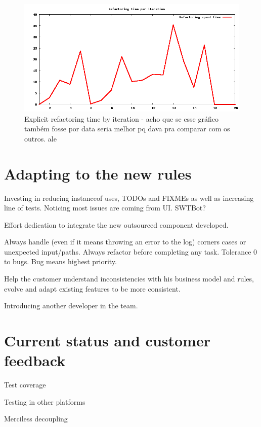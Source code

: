 \documentclass[lnbip]{svmultln}
\begin{document}
\begin{figure}[hbt]
  \centerline{
    \includegraphics[width=120mm]{refactoring.png}
  }
  \caption{Explicit refactoring time by iteration - acho que se esse gráfico também fosse por data seria melhor pq dava pra comparar com os outros. ale}%
  \label{fig:refactoring}
\end{figure}

\section{Adapting to the new rules}
\label{sec:adapting}

Investing in reducing instanceof uses, TODOs and FIXMEs as well as
increasing line of tests. Noticing most issues are coming from
UI. SWTBot?

Effort dedication to integrate the new outsourced component developed.

Always handle (even if it means throwing an error to the log) corners
cases or unexpected input/paths. Always refactor before completing any
task. Tolerance 0 to bugs. Bug means highest priority.

Help the customer understand inconsistencies with his business model and rules,
evolve and adapt existing features to be more consistent.

Introducing another developer in the team.

\section{Current status and customer feedback}
\label{sec:nowadays}

Test coverage

Testing in other platforms

Merciless decoupling
\end{document}
